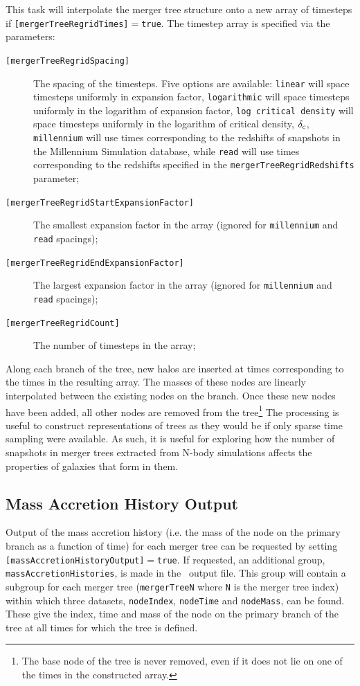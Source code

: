This task will interpolate the merger tree structure onto a new array of timesteps if {\tt [mergerTreeRegridTimes]}$=${\tt true}. The timestep array is specified via the parameters:
\begin{description}
\item[{\tt [mergerTreeRegridSpacing]}] The spacing of the timesteps. Five options are available: {\tt linear} will space timesteps uniformly in expansion factor, {\tt logarithmic} will space timesteps uniformly in the logarithm of expansion factor, {\tt log critical density} will space timesteps uniformly in the logarithm of critical density, $\delta_{\rm c}$, {\tt millennium} will use times corresponding to the redshifts of snapshots in the Millennium Simulation database, while {\tt read} will use times corresponding to the redshifts specified in the {\tt mergerTreeRegridRedshifts} parameter;
\item[{\tt [mergerTreeRegridStartExpansionFactor]}] The smallest expansion factor in the array (ignored for {\tt millennium} and {\tt read} spacings);
\item[{\tt [mergerTreeRegridEndExpansionFactor]}] The largest expansion factor in the array (ignored for {\tt millennium} and {\tt read} spacings);
\item[{\tt [mergerTreeRegridCount]}] The number of timesteps in the array;
\end{description}
Along each branch of the tree, new halos are inserted at times corresponding to the times in the resulting array. The masses of these nodes are linearly interpolated between the existing nodes on the branch. Once these new nodes have been added, all other nodes are removed from the tree\footnote{The base node of the tree is never removed, even if it does not lie on one of the times in the constructed array.} The processing is useful to construct representations of trees as they would be if only sparse time sampling were available. As such, it is useful for exploring how the number of snapshots in merger trees extracted from N-body simulations affects the properties of galaxies that form in them.

\subsection{Mass Accretion History Output}

Output of the mass accretion history (i.e. the mass of the \gls{node} on the primary branch as a function of time) for each merger tree can be requested by setting {\tt [massAccretionHistoryOutput]}$=${\tt true}. If requested, an additional group, {\tt massAccretionHistories}, is made in the \glc\ output file. This group will contain a subgroup for each merger tree ({\tt mergerTreeN} where {\tt N} is the merger tree index) within which three datasets, {\tt nodeIndex}, {\tt nodeTime} and {\tt nodeMass}, can be found. These give the index, time and mass of the \gls{node} on the primary branch of the tree at all times for which the tree is defined.

